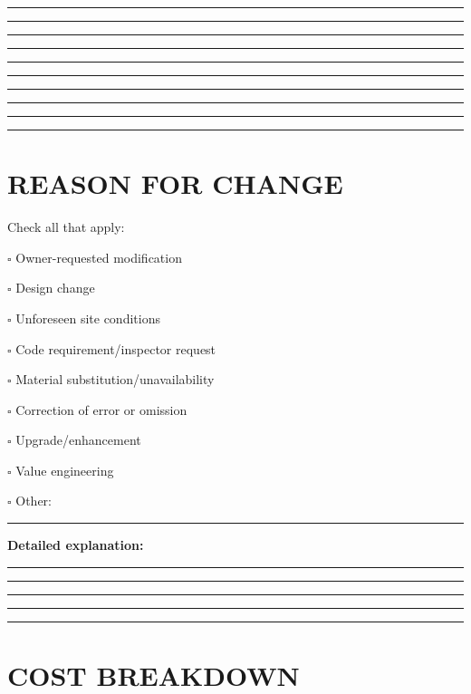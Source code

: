 \documentclass[11pt,letterpaper]{article}
\begin{document}
\rule{14cm}{0.4pt}

\rule{14cm}{0.4pt}

\rule{14cm}{0.4pt}

\rule{14cm}{0.4pt}

\rule{14cm}{0.4pt}

\rule{14cm}{0.4pt}

\rule{14cm}{0.4pt}

\rule{14cm}{0.4pt}

\rule{14cm}{0.4pt}

\rule{14cm}{0.4pt}

\newpage

\section*{REASON FOR CHANGE}

Check all that apply:

$\square$ Owner-requested modification

$\square$ Design change

$\square$ Unforeseen site conditions

$\square$ Code requirement/inspector request

$\square$ Material substitution/unavailability

$\square$ Correction of error or omission

$\square$ Upgrade/enhancement

$\square$ Value engineering

$\square$ Other: \rule{8cm}{0.4pt}

\vspace{6pt}

\textbf{Detailed explanation:}

\rule{14cm}{0.4pt}

\rule{14cm}{0.4pt}

\rule{14cm}{0.4pt}

\rule{14cm}{0.4pt}

\rule{14cm}{0.4pt}

\vspace{6pt}

\section*{COST BREAKDOWN}
\end{document}
